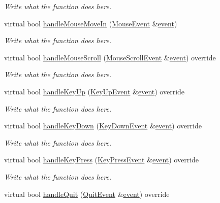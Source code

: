 \begin{DoxyCompactItemize}
\begin{DoxyCompactList}\small\item\em Write what the function does here. \end{DoxyCompactList}\item 
virtual bool \hyperlink{classGUIElement_ae1c939c5af3544b9a5967b9035623459}{handle\+Mouse\+Move\+In} (\hyperlink{classMouseEvent}{Mouse\+Event} \&\hyperlink{unionSDL__Event}{event})
\begin{DoxyCompactList}\small\item\em Write what the function does here. \end{DoxyCompactList}\item 
virtual bool \hyperlink{classGUIElement_a3640473a7fb9651a1298122a0e0a8b29}{handle\+Mouse\+Scroll} (\hyperlink{structMouseScrollEvent}{Mouse\+Scroll\+Event} \&\hyperlink{unionSDL__Event}{event}) override
\begin{DoxyCompactList}\small\item\em Write what the function does here. \end{DoxyCompactList}\item 
virtual bool \hyperlink{classGUIElement_a7f0049f13cb199d09b6cf2e61ea8e7a3}{handle\+Key\+Up} (\hyperlink{classKeyUpEvent}{Key\+Up\+Event} \&\hyperlink{unionSDL__Event}{event}) override
\begin{DoxyCompactList}\small\item\em Write what the function does here. \end{DoxyCompactList}\item 
virtual bool \hyperlink{classGUIElement_aa85f949aa746eac4deadfa0bb8827f71}{handle\+Key\+Down} (\hyperlink{classKeyDownEvent}{Key\+Down\+Event} \&\hyperlink{unionSDL__Event}{event}) override
\begin{DoxyCompactList}\small\item\em Write what the function does here. \end{DoxyCompactList}\item 
virtual bool \hyperlink{classGUIElement_ac5b578dfd0da486e32d4cf223b2d6513}{handle\+Key\+Press} (\hyperlink{structKeyPressEvent}{Key\+Press\+Event} \&\hyperlink{unionSDL__Event}{event}) override
\begin{DoxyCompactList}\small\item\em Write what the function does here. \end{DoxyCompactList}\item 
virtual bool \hyperlink{classGUIElement_a03dc64741eed1946966776ac3af96e65}{handle\+Quit} (\hyperlink{structQuitEvent}{Quit\+Event} \&\hyperlink{unionSDL__Event}{event}) override

\end{DoxyCompactItemize}
